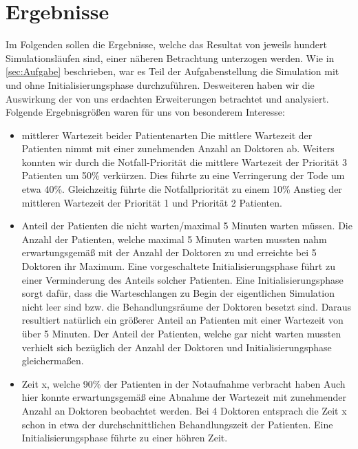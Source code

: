 \documentclass[12pt,fleqn,a4paper]{article}
\begin{document}
\newpage

\section{Ergebnisse}
Im Folgenden sollen die Ergebnisse, welche das Resultat von jeweils hundert Simulationsl\"{a}ufen sind, einer n\"{a}heren Betrachtung unterzogen werden.
Wie in \ref{sec:Aufgabe} beschrieben, war es Teil der Aufgabenstellung die Simulation mit und ohne Initialisierungsphase durchzuf\"{u}hren.
Desweiteren haben wir die Auswirkung  der von uns erdachten Erweiterungen betrachtet und analysiert.
Folgende Ergebnisgr\"{o}{\ss}en waren f\"{u}r uns von besonderem Interesse:
\begin{itemize}

	\item mittlerer Wartezeit beider Patientenarten\newline
	Die mittlere Wartezeit der Patienten nimmt mit einer zunehmenden Anzahl an Doktoren ab.
	Weiters konnten wir durch die Notfall-Priorit\"{a}t die mittlere Wartezeit der Priorit\"{a}t 3 Patienten um 50\% verk\"{u}rzen. Dies f\"{u}hrte zu eine
	Verringerung der Tode um etwa 40\%. Gleichzeitig f\"{u}hrte die Notfallpriorit\"{a}t zu einem 10\% Anstieg der mittleren Wartezeit der Priorit\"{a}t 1 und Priorit\"{a}t 2 Patienten. 
	
	\item Anteil der Patienten die nicht warten/maximal 5 Minuten warten m\"{u}ssen.\newline
	Die Anzahl der Patienten, welche maximal 5 Minuten warten mussten nahm erwartungsgem\"{a}{\ss} mit der Anzahl der Doktoren zu und erreichte bei 5 Doktoren ihr Maximum. Eine vorgeschaltete Initialisierungsphase f\"{u}hrt zu einer Verminderung des Anteils solcher Patienten.
Eine Initialisierungsphase sorgt daf\"{u}r, dass die Warteschlangen zu Begin der eigentlichen Simulation nicht leer sind bzw.
 die Behandlungsr\"{a}ume der Doktoren besetzt sind. Daraus resultiert nat\"{u}rlich ein gr\"{o}{\ss}erer Anteil an Patienten mit einer Wartezeit von \"{u}ber 5 Minuten. 
	Der Anteil der Patienten, welche gar nicht warten mussten verhielt sich bez\"{u}glich der Anzahl der Doktoren und Initialisierungsphase gleicherma{\ss}en.

	\item Zeit x, welche 90\% der Patienten in der Notaufnahme verbracht haben \newline
	Auch hier konnte erwartungsgem\"{a}{\ss} eine Abnahme der Wartezeit mit zunehmender Anzahl an Doktoren beobachtet werden. Bei 4 Doktoren entsprach die Zeit x schon in etwa der durchschnittlichen Behandlungszeit der Patienten. 
Eine Initialisierungsphase f\"{u}hrte zu einer h\"{o}hren Zeit.


\end{itemize}
\end{document}
